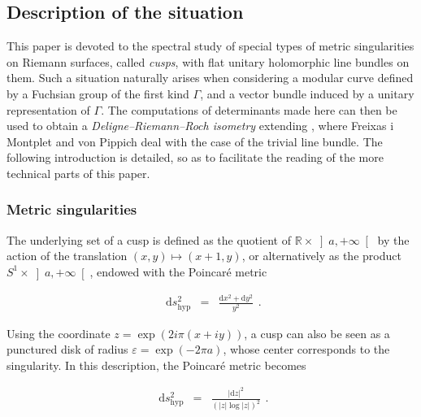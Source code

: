 \documentclass{jams-l}
\theoremstyle{definition}
\theoremstyle{remark}
\numberwithin{equation}{section}
\begin{document}
    \subsection{Description of the situation}
    
        This paper is devoted to the spectral study of special types of metric singularities on Riemann surfaces, called \textit{cusps}, with flat unitary holomorphic line bundles on them. Such a situation naturally arises when considering a modular curve defined by a Fuchsian group of the first kind $\Gamma$, and a vector bundle induced by a unitary representation of $\Gamma$. The computations of determinants made here can then be used to obtain a \textit{Deligne--Riemann--Roch isometry} extending \cite{MR4167014}, where Freixas i Montplet and von Pippich deal with the case of the trivial line bundle. The following introduction is detailed, so as to facilitate the reading of the more technical parts of this paper.
        
        
        \subsubsection{Metric singularities}
        \label{SubSubSecMetricSingularities}
    
            The underlying set of a cusp is defined as the quotient of $\mathbb{R} \times \left] a, + \infty \right[$ by the action of the translation $\left( x,y \right) \mapsto \left( x+1, y \right)$, or alternatively as the product $S^1 \times \left] a, + \infty \right[$, endowed with the Poincaré metric
        
            \[ \begin{array}{lll}
                    \mathrm{d}s^2_{\mathrm{hyp}} & = & \frac{\mathrm{d}x^2 + \mathrm{d}y^2}{y^2}
                \end{array} . \]
        
            \noindent Using the coordinate $z = \exp \left( 2 i \pi \left( x+iy \right) \right)$, a cusp can also be seen as a punctured disk of radius $ \varepsilon =\exp \left( - 2 \pi a \right)$, whose center corresponds to the singularity. In this description, the Poincaré metric becomes
        
            \[ \begin{array}{lll}
                    \mathrm{d}s^2_{\mathrm{hyp}} & = & \frac{\left\vert \mathrm{d} z \right \vert^2}{\left( \left \vert z \right \vert \log \left \vert z \right\vert \right)^2}
                \end{array} . \]
        
\end{document}
